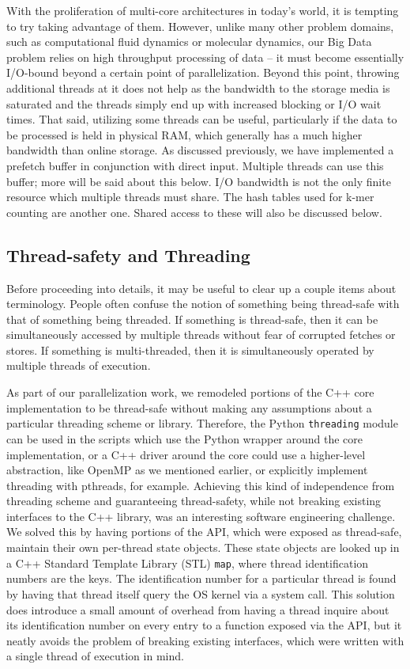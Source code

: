 \documentclass{article}
\begin{document}
With the proliferation of multi-core architectures in today's world, it is
tempting to try taking advantage of them. However, unlike many other problem
domains, such as computational fluid dynamics or molecular dynamics, our Big
Data problem relies on high throughput processing of data -- it
must become essentially I/O-bound beyond a certain point of parallelization.
Beyond this point, throwing
additional threads at it does not help as the bandwidth to the storage media is
saturated and the threads simply end up with increased blocking or I/O wait
times. That said, utilizing some threads can be useful, particularly if the
data to be processed is held in physical RAM, which generally has a much higher
bandwidth than online storage. As discussed previously, we have implemented a
prefetch buffer in conjunction with direct input. Multiple threads can use this
buffer; more will be said about this below. I/O bandwidth is not the only
finite resource which multiple threads must share. The hash tables used for
k-mer counting are another one. Shared access to these will also be discussed
below.

\subsection{Thread-safety and Threading}

Before proceeding into details, it may be useful to clear up a couple items
about terminology. People often confuse the notion of something being
thread-safe with that of something being threaded. If something is thread-safe,
then it can be simultaneously accessed by multiple threads without fear of
corrupted fetches or stores. If something is multi-threaded, then it is
simultaneously operated by multiple threads of execution.

As part of our parallelization work, we remodeled portions of the C++ core
implementation to be thread-safe without making any assumptions about a
particular threading scheme or library. Therefore, the Python
\texttt{threading} module can be used in the scripts which use the Python
wrapper around the core implementation, or a C++ driver around the core could
use a higher-level abstraction, like OpenMP as we mentioned earlier, or
explicitly implement threading with pthreads, for example. Achieving this kind
of independence from threading scheme and guaranteeing thread-safety, while not
breaking existing interfaces to the C++ library, was an interesting software
engineering challenge. We solved this by having portions of the API, which were
exposed as thread-safe, maintain their own per-thread state objects. These
state objects are looked up in a C++ Standard Template Library (STL)
\texttt{map}, where thread identification numbers are the keys. The
identification number for a particular thread is found by having that thread
itself query the OS kernel via a system call. This solution does introduce a
small amount of overhead from having a thread inquire about its identification
number on every entry to a function exposed via the API, but it neatly avoids
the problem of breaking existing interfaces, which were written with a single
thread of execution in mind.
\end{document}
